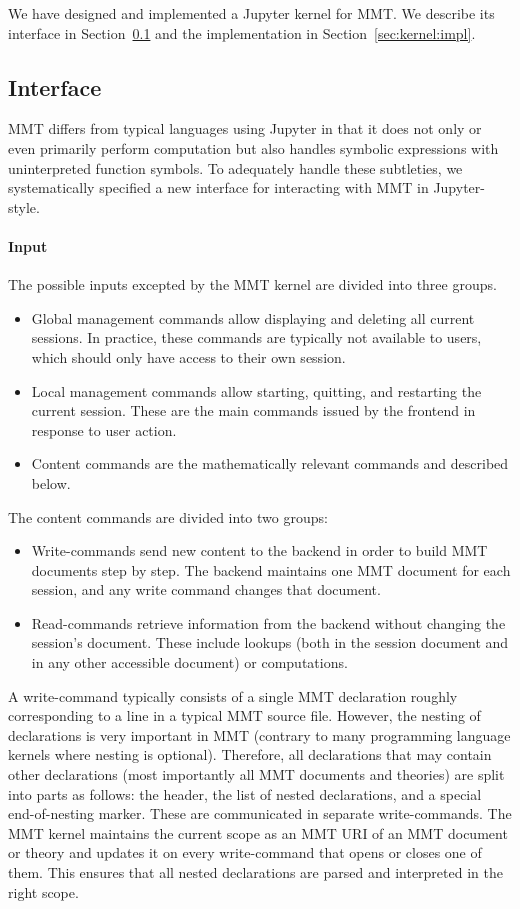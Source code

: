 We have designed and implemented a Jupyter kernel for MMT.
We describe its interface in Section~\ref{sec:kernel:syntax} and the implementation in Section~\ref{sec:kernel:impl}.

\subsection{Interface}\label{sec:kernel:syntax}

MMT differs from typical languages using Jupyter in that it does not only or even primarily perform computation but also handles symbolic expressions with uninterpreted function symbols.
To adequately handle these subtleties, we systematically specified a new interface for interacting with MMT in Jupyter-style.

\paragraph{Input}
The possible inputs excepted by the MMT kernel are divided into three groups.
\begin{itemize}
\item Global management commands allow displaying and deleting all current sessions.
 In practice, these commands are typically not available to users, which should only have access to their own session.
\item Local management commands allow starting, quitting, and restarting the current session. These are the main commands issued by the frontend in response to user action.
\item Content commands are the mathematically relevant commands and described below.
\end{itemize}

The content commands are divided into two groups:
\begin{itemize}
 \item Write-commands send new content to the backend in order to build MMT documents step by step.
   The backend maintains one MMT document for each session, and any write command changes that document.
 \item Read-commands retrieve information from the backend without changing the session's document.
   These include lookups (both in the session document and in any other accessible document) or computations.
\end{itemize}

A write-command typically consists of a single MMT declaration roughly corresponding to a line in a typical MMT source file.
However, the nesting of declarations is very important in MMT (contrary to many programming language kernels where nesting is optional).
Therefore, all declarations that may contain other declarations (most importantly all MMT documents and theories) are split into parts as follows: the header, the list of nested declarations, and a special end-of-nesting marker. These are communicated in separate write-commands.
The MMT kernel maintains the current scope as an MMT URI of an MMT document or theory and updates it on every write-command that opens or closes one of them.
This ensures that all nested declarations are parsed and interpreted in the right scope.

